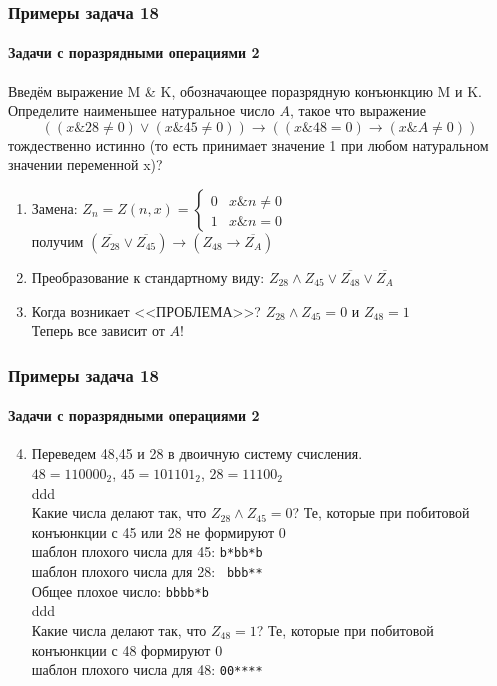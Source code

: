 \begin{frame}[t]
\frametitle{Примеры задача 18}
\framesubtitle{Задачи с поразрядными операциями 2}

Введём выражение M \& K, обозначающее поразрядную конъюнкцию M и K. Определите наименьшее натуральное число $A$, такое что выражение
$$( (x \& 28 \neq 0) \vee  (x \& 45 \neq 0)) \rightarrow ((x \& 48 = 0) \rightarrow (x \& A \neq 0))$$
тождественно истинно (то есть принимает значение 1 при любом натуральном значении переменной x)?

	\begin{enumerate}
		\item Замена: $Z_{n}=Z(n,x)=\begin{cases}
0 & x\&n\neq0\\
1 & x\&n=0
\end{cases}$ \\
получим $(\overline{Z_{28}}\vee \overline{Z_{45}}) \rightarrow (Z_{48} \rightarrow \overline{Z_A})$ 	\pause 
		\item Преобразование к стандартному виду: 
		$Z_{28} \wedge Z_{45}  \vee \overline{Z_{48}} \vee \overline{Z_A}$ 	\pause 
		\item Когда возникает <<ПРОБЛЕМА>>? 
		      $Z_{28} \wedge Z_{45}=0$ и $Z_{48}=1$ \\Теперь все зависит от $A$!
					
	\end{enumerate}
	
	
\end{frame}


\begin{frame}[t]
\frametitle{Примеры задача 18}
\framesubtitle{Задачи с поразрядными операциями 2}

	\begin{enumerate}
	\setcounter{enumi}{3}
		\item 
		Переведем 48,45 и 28 в двоичную систему счисления.\\
		$48=110000_2$, $45=101101_2$, $28=11100_2$\\
		\textcolor[rgb]{1,1,1}{ddd}\\ 	\pause 
		Какие числа делают так, что $Z_{28} \wedge Z_{45}=0$? Те, которые при побитовой конъюнкции с 45 или 28 не формируют 0\\
		шаблон плохого числа для 45: \texttt{b*bb*b}\\
		шаблон плохого числа для 28: \texttt{ bbb**}\\ 	\pause 
		Общее плохое число: \texttt{bbbb*b}\\  
		\textcolor[rgb]{1,1,1}{ddd}\\ 	\pause 
		Какие числа делают так, что $Z_{48}=1$? Те, которые при побитовой конъюнкции с 48 формируют 0\\ 	\pause 
		шаблон плохого числа для 48: \texttt{00****}
		
							
	\end{enumerate}
	
	
\end{frame}


